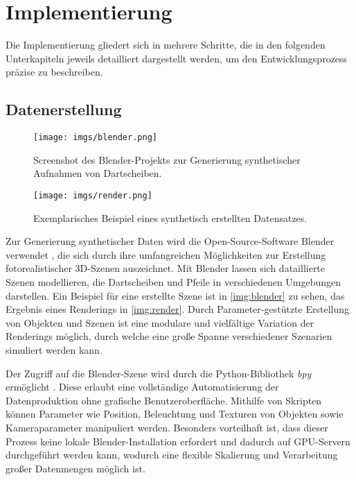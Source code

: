 \section{Implementierung}
\label{sec:implementierung}
Die Implementierung gliedert sich in mehrere Schritte, die in den folgenden Unterkapiteln jeweils detailliert dargestellt werden, um den Entwicklungsprozess präzise zu beschreiben.

\subsection{Datenerstellung}
\label{sec:implementierung:datenerstellung}

\begin{figure}
    \centering
    \texttt{[image: imgs/blender.png]}
    \caption{Screenshot des Blender-Projekts zur Generierung synthetischer Aufnahmen von Dartscheiben.}
    \label{img:blender}
\end{figure}

\begin{figure}
    \centering
    \texttt{[image: imgs/render.png]}
    \caption{Exemplarisches Beispiel eines synthetisch erstellten Datensatzes.}
    \label{img:render}
\end{figure}

Zur Generierung synthetischer Daten wird die Open-Source-Software Blender verwendet \cite{blender}, die sich durch ihre umfangreichen Möglichkeiten zur Erstellung fotorealistischer 3D-Szenen auszeichnet. Mit Blender lassen sich dataillierte Szenen modellieren, die Dartscheiben und Pfeile in verschiedenen Umgebungen darstellen. Ein Beispiel für eine erstellte Szene ist in \autoref{img:blender} zu sehen, das Ergebnis eines Renderings in \autoref{img:render}. Durch Parameter-gestützte Erstellung von Objekten und Szenen ist eine modulare und vielfältige Variation der Renderings möglich, durch welche eine große Spanne verschiedener Szenarien simuliert werden kann.

Der Zugriff auf die Blender-Szene wird durch die Python-Bibliothek \textit{bpy} ermöglicht \cite{bpy}. Diese erlaubt eine vollständige Automatisierung der Datenproduktion ohne grafische Benutzeroberfläche. Mithilfe von Skripten können Parameter wie Position, Beleuchtung und Texturen von Objekten sowie Kameraparameter manipuliert werden. Besonders vorteilhaft ist, dass dieser Prozess keine lokale Blender-Installation erfordert und dadurch auf GPU-Servern durchgeführt werden kann, wodurch eine flexible Skalierung und Verarbeitung großer Datenmengen möglich ist.

